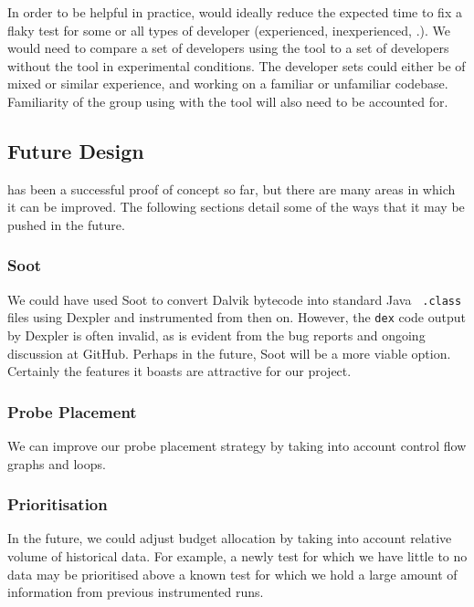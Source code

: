 In order to be helpful in practice, \venera would ideally reduce the expected
time to fix a flaky test for some or all types of developer (experienced,
inexperienced, \etc.). We would need to compare a set of developers using the
tool to a set of developers without the tool in experimental conditions. The
developer sets could either be of mixed or similar experience, and working on a
familiar or unfamiliar codebase. Familiarity of the group using \venera with
the tool will also need to be accounted for.


\subsection{Future Design}
\label{sec:sec:future_design}

\venera has been a successful proof of concept so far, but there are many areas
in which it can be improved. The following sections detail some of the ways that
it may be pushed in the future.

\subsubsection{Soot}

We could have used Soot to convert Dalvik bytecode into standard Java {\tt
.class} files using Dexpler \cite{bartel:soap2012} and instrumented from then
on. However, the {\tt dex} code output by Dexpler is often invalid, as is
evident from the bug reports and ongoing discussion at GitHub. Perhaps in the
future, Soot will be a more viable option. Certainly the features it boasts are
attractive for our project.

\subsubsection{Probe Placement}

We can improve our probe placement strategy by taking into account control flow
graphs and loops.

\subsubsection{Prioritisation}

In the future, we could adjust \flaky budget allocation by taking into account
relative volume of historical data. For example, a newly \flaky test for which
we have little to no data may be prioritised above a known \flaky test for which
we hold a large amount of information from previous instrumented runs.

